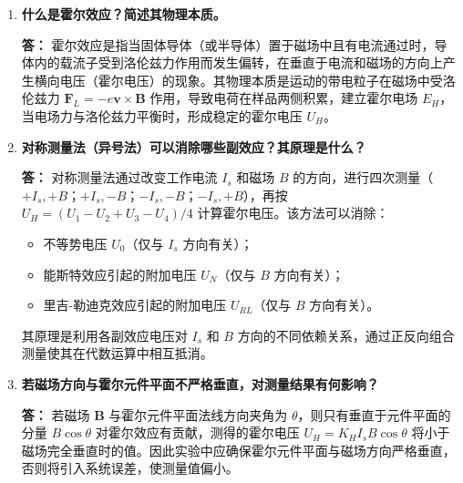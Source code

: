 \begin{enumerate}[label=\arabic* 、, leftmargin=4em, labelsep=0pt]

    \item \textbf{什么是霍尔效应？简述其物理本质。}

    \textbf{答：} 霍尔效应是指当固体导体（或半导体）置于磁场中且有电流通过时，导体内的载流子受到洛伦兹力作用而发生偏转，在垂直于电流和磁场的方向上产生横向电压（霍尔电压）的现象。其物理本质是运动的带电粒子在磁场中受洛伦兹力 $\mathbf{F}_L = -e\mathbf{v} \times \mathbf{B}$ 作用，导致电荷在样品两侧积累，建立霍尔电场 $E_H$，当电场力与洛伦兹力平衡时，形成稳定的霍尔电压 $U_H$。

    \item \textbf{对称测量法（异号法）可以消除哪些副效应？其原理是什么？}

    \textbf{答：} 对称测量法通过改变工作电流 $I_s$ 和磁场 $B$ 的方向，进行四次测量（$+I_s,+B$；$+I_s,-B$；$-I_s,-B$；$-I_s,+B$），再按 $U_H = (U_1-U_2+U_3-U_4)/4$ 计算霍尔电压。该方法可以消除：
    \begin{itemize}
        \item 不等势电压 $U_0$（仅与 $I_s$ 方向有关）；
        \item 能斯特效应引起的附加电压 $U_N$（仅与 $B$ 方向有关）；
        \item 里吉-勒迪克效应引起的附加电压 $U_{RL}$（仅与 $B$ 方向有关）。
    \end{itemize}
    其原理是利用各副效应电压对 $I_s$ 和 $B$ 方向的不同依赖关系，通过正反向组合测量使其在代数运算中相互抵消。

    \item \textbf{若磁场方向与霍尔元件平面不严格垂直，对测量结果有何影响？}

    \textbf{答：} 若磁场 $\mathbf{B}$ 与霍尔元件平面法线方向夹角为 $\theta$，则只有垂直于元件平面的分量 $B\cos\theta$ 对霍尔效应有贡献，测得的霍尔电压 $U_H = K_H I_s B\cos\theta$ 将小于磁场完全垂直时的值。因此实验中应确保霍尔元件平面与磁场方向严格垂直，否则将引入系统误差，使测量值偏小。

\end{enumerate}
